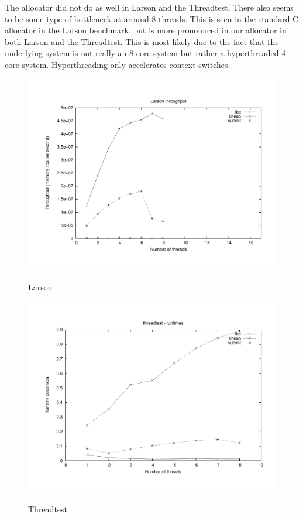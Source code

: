 \documentclass[oneside]{amsart}
\theoremstyle{definition}
\theoremstyle{remark}
\numberwithin{equation}{section}
\begin{document}
The allocator did not do as well in Larson and the Threadtest. There also seems to be some type of
bottleneck at around 8 threads. This is seen in the standard C allocator in the Larson benchmark,
but is more pronounced in our allocator in both Larson and the Threadtest. This is most likely due
to the fact that the underlying system is not really an 8 core system but rather a hyperthreaded 4
core system. Hyperthreading only accelerates context switches.

\begin{figure}[h]
    \caption{Larson}
    \centering
    \includegraphics[scale=0.33]{../benchmarks/larson/larson.pdf}
    \label{fig:larson}
\end{figure}

\begin{figure}[h]
    \caption{Threadtest}
    \centering
    \includegraphics[scale=0.33]{../benchmarks/threadtest/threadtest.pdf}
    \label{fig:threadtest}
\end{figure}
\end{document}
